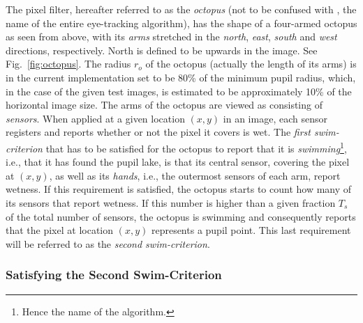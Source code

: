 The pixel filter, hereafter referred to as the {\em octopus\/} (not to
be confused with {\octopus}, the name of the entire eye-tracking
algorithm), has the shape of a four-armed octopus as seen from above,
with its {\em arms\/} stretched in the {\em north\/}, {\em east\/},
{\em south\/} and {\em west\/} directions, respectively.  North is
defined to be upwards in the image.  See Fig.~\ref{fig:octopus}.  The
radius $r_{o}$ of the octopus (actually the length of its arms) is in
the current implementation set to be 80\% of the minimum pupil radius,
which, in the case of the given test images, is estimated to be
approximately 10\% of the horizontal image size.  The arms of the
octopus are viewed as consisting of {\em sensors\/}.  When applied at
a given location $(x,y)$ in an image, each sensor registers and
reports whether or not the pixel it covers is wet.  The {\em first
  swim-criterion\/} that has to be satisfied for the octopus to report
that it is {\em swimming\/}\footnote{Hence the name of the
  algorithm.}, i.e., that it has found the pupil lake, is that its
central sensor, covering the pixel at $(x,y)$, as well as its {\em
  hands\/}, i.e., the outermost sensors of each arm, report wetness.
If this requirement is satisfied, the octopus starts to count how many
of its sensors that report wetness.  If this number is higher than a
given fraction $T_{s}$ of the total number of sensors, the octopus is
swimming and consequently reports that the pixel at location $(x,y)$
represents a pupil point.  This last requirement will be referred to
as the {\em second swim-criterion\/}.


\subsubsection{Satisfying the Second Swim-Criterion}
\label{pg:Ts}


